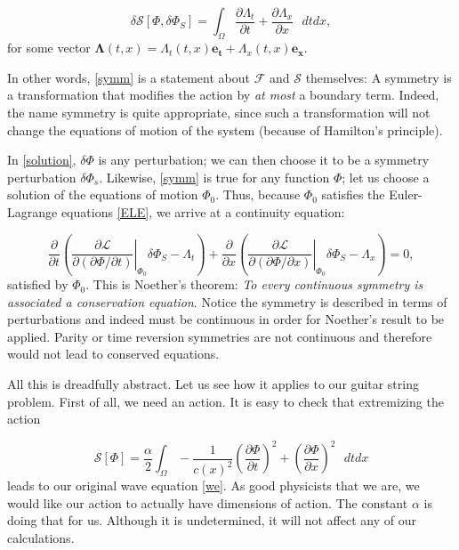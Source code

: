 \documentclass{article}
\begin{document}
\begin{equation}\label{symm}
\delta\mathcal{S}[\Phi,\delta\Phi_S]=\int_\Omega\frac{\partial \Lambda_t}{\partial t}+\frac{\partial \Lambda_x}{\partial x}\text{ }dtdx,
\end{equation}
for some vector $\bm{\Lambda}(t,x)=\Lambda_t(t,x)\bm{e_t}+\Lambda_x(t,x)\bm{e_x}$.

In other words, \eqref{symm} is a statement about $\mathcal{F}$ and $\mathcal{S}$ themselves: A symmetry is a transformation that modifies the action by \textit{at most} a boundary term. Indeed, the name symmetry is quite appropriate, since such a transformation will not change the equations of motion of the system (because of Hamilton's principle).

In \eqref{solution}, $\delta\Phi$ is any perturbation; we can then choose it to be a symmetry perturbation $\delta\Phi_s$. Likewise, \eqref{symm} is true for any function $\Phi$; let us choose a solution of the equations of motion $\Phi_0$. Thus, because $\Phi_0$ satisfies the Euler-Lagrange equations \eqref{ELE}, we arrive at a continuity equation:

\begin{equation}\label{noether}
\boxed{\frac{\partial}{\partial t}\left(\left.\frac{\partial \mathcal{L}}{\partial\left(\partial\Phi/\partial t\right)}\right|_{\Phi_0}\delta\Phi_S-\Lambda_t\right)+\frac{\partial}{\partial x}\left(\left.\frac{\partial \mathcal{L}}{\partial\left(\partial\Phi/\partial x\right)}\right|_{\Phi_0}\delta\Phi_S-\Lambda_x\right)=0},
\end{equation}
satisfied by $\Phi_0$. This is Noether's theorem: \textit{To every continuous symmetry is associated a conservation equation}. Notice the symmetry is described in terms of perturbations and indeed must be continuous in order for Noether's result to be applied. Parity or time reversion symmetries are not continuous and therefore would not lead to conserved equations.

All this is dreadfully abstract. Let us see how it applies to our guitar string problem. First of all, we need an action. It is easy to check that extremizing the action

\begin{equation}\label{wea}
\mathcal{S}[\Phi]=\frac{\alpha}{2}\int_\Omega-\frac{1}{c(x)^2}\left(\frac{\partial\Phi}{\partial t}\right)^2+\left(\frac{\partial\Phi}{\partial x}\right)^2\text{ }dtdx
\end{equation}
leads to our original wave equation \eqref{we}. As good physicists that we are, we would like our action to actually have dimensions of action. The constant $\alpha$ is doing that for us. Although it is undetermined, it will not affect any of our calculations.
\end{document}
